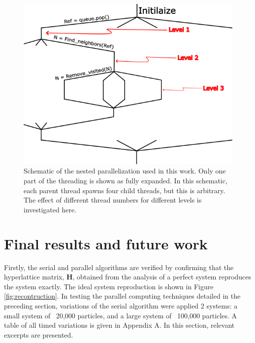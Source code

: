 \documentclass{article}
\begin{document}
\begin{figure}[htp!]
    \includegraphics[scale=1.2]{nested.png}
    \caption{Schematic of the nested parallelization used in this work. Only one part of the threading is shown as fully expanded. In this schematic, each parent thread spawns four child threads, but this is arbitrary. The effect of different thread numbers for different levels is investigated here.}
    \label{fig:nested}
    \centering
\end{figure}

\section{Final results and future work}
Firstly, the serial and parallel algorithms are verified by confirming that the hyperlattice matrix, $\mathbf{H}$, obtained from the analysis of a perfect system reproduces the system exactly. The ideal system reproduction is shown in Figure \ref{fig:recontruction}. In testing the parallel computing techniques detailed in the preceding section, variations of the serial algorithm were applied 2 systems: a small system of ~20,000 particles, and a large system of ~100,000 particles. A table of all timed variations is given in Appendix A. In this section, relevant excerpts are presented.
\end{document}
